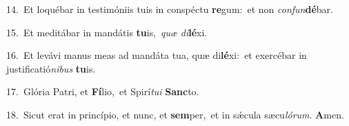 {\numbfont\textcolor{\numbcolor}{14.}}~Et loquébar in testimóniis tuis in conspéctu \textbf{re}\-gum:~\star et non \textit{con}\-\textit{fun}\textbf{dé}bar.\par
{\numbfont\textcolor{\numbcolor}{15.}}~Et meditábar in mandátis \textbf{tu}\-is,~\star \textit{quæ} \textit{di}\-\textbf{lé}xi.\par
{\numbfont\textcolor{\numbcolor}{16.}}~Et levávi manus meas ad mandáta tua, quæ di\-\textbf{lé}\-xi:~\star et exercébar in justificatió\-\textit{ni}\-\textit{bus} \textbf{tu}\-is.\par
{\numbfont\textcolor{\numbcolor}{17.}}~Glória Patri, et \textbf{Fí}\-lio,~\star et Spirí\-\textit{tu}\-\textit{i} \textbf{Sanc}\-to.\par
{\numbfont\textcolor{\numbcolor}{18.}}~Sicut erat in princípio, et nunc, et \textbf{sem}\-per,~\star et in sǽcula sæcu\-\textit{ló}\-\textit{rum}. \textbf{A}\-men.\par
